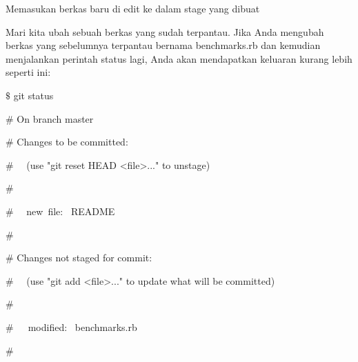\noindent 
{\fontsize{14pt}{14pt}\selectfont Memasukan berkas baru di edit ke dalam stage yang dibuat \\} \par
\vspace{14pt}
\noindent 
{\fontsize{14pt}{14pt}\selectfont Mari kita ubah sebuah berkas yang sudah terpantau. Jika Anda mengubah berkas yang sebelumnya terpantau bernama $  $benchmarks.rb $  $dan kemudian menjalankan perintah $  $status $  $lagi, Anda akan mendapatkan keluaran kurang lebih seperti ini: \\} \par
\vspace{14pt}
\noindent 
{\fontsize{14pt}{14pt}\selectfont  $  \$  $ git status \\} \par
\noindent 
{\fontsize{14pt}{14pt}\selectfont  $  \#  $ On branch master \\} \par
\noindent 
{\fontsize{14pt}{14pt}\selectfont  $  \#  $ Changes to be committed: \\} \par
\noindent 
{\fontsize{14pt}{14pt}\selectfont  $  \#  $~~ (use "git reset HEAD <file>..." to unstage) \\} \par
\noindent 
{\fontsize{14pt}{14pt}\selectfont  $  \#  $ \\} \par
\noindent 
{\fontsize{14pt}{14pt}\selectfont  $  \#  $~~ new~file:~  README \\} \par
\noindent 
{\fontsize{14pt}{14pt}\selectfont  $  \#  $ \\} \par
\noindent 
{\fontsize{14pt}{14pt}\selectfont  $  \#  $ Changes not staged for commit: \\} \par
\noindent 
{\fontsize{14pt}{14pt}\selectfont  $  \#  $~~ (use "git add <file>..." to update what will be committed) \\} \par
\noindent 
{\fontsize{14pt}{14pt}\selectfont  $  \#  $ \\} \par
\noindent 
{\fontsize{14pt}{14pt}\selectfont  $  \#  $~~~modified:~  benchmarks.rb \\} \par
\noindent 
{\fontsize{14pt}{14pt}\selectfont  $  \#  $ \\} \par
